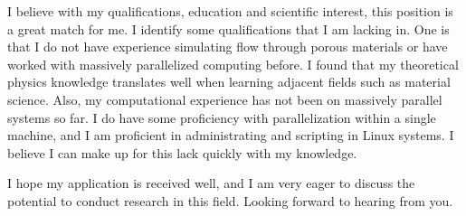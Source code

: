 I believe with my qualifications, education and scientific interest, this position is a great match for me.
I identify some qualifications that I am lacking in.
One is that I do not have experience simulating flow through porous materials or have worked with massively parallelized computing before.
I found that my theoretical physics knowledge translates well when learning adjacent fields such as material science.
Also, my computational experience has not been on massively parallel systems so far.
I do have some proficiency with parallelization within a single machine, and I am proficient in administrating and scripting in Linux systems.
I believe I can make up for this lack quickly with my knowledge.

I hope my application is received well, and I am very eager to discuss the potential to conduct research in this field.
Looking forward to hearing from you.
